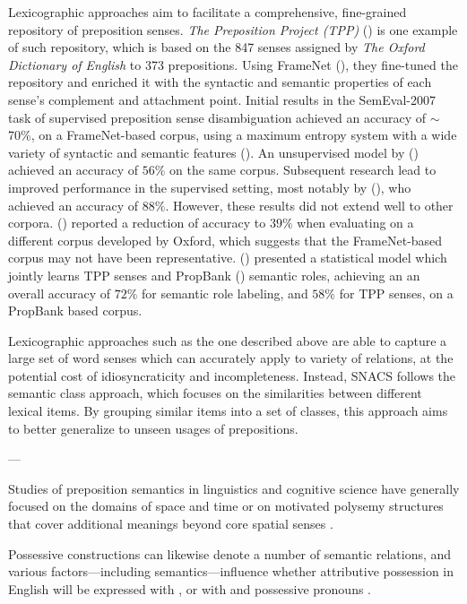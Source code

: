 Lexicographic approaches aim to facilitate a comprehensive, fine-grained repository of preposition senses. \textit{The Preposition Project (TPP)} (\cite{litkowski-05}) is one example of such repository, which is based on the 847 senses assigned by \textit{The Oxford Dictionary of English} to 373 prepositions. Using FrameNet (\cite{baker-98}), they fine-tuned the repository and enriched it with the syntactic and semantic properties of each sense's complement and attachment point. Initial results in the SemEval-2007 task of supervised preposition sense disambiguation achieved an accuracy of $\sim$70\%, on a FrameNet-based corpus, using a maximum entropy system with a wide variety of syntactic and semantic
features (\cite{ye2007melb}). An unsupervised model by (\cite{hovy-11}) achieved an accuracy of $56\%$ on the same corpus. Subsequent research lead to improved performance in the supervised setting, most notably by (\cite{tratz2011semantically}), who achieved an accuracy of $88\%$. 
However, these results did not extend well to other corpora. (\cite{litkowski2013preposition}) reported a reduction of accuracy to $39\%$ when evaluating on a different corpus developed by Oxford, which suggests that the FrameNet-based corpus may not have been representative. (\cite{dahlmeier-09}) presented a statistical model which jointly learns TPP senses and PropBank (\cite{kingsbury2002treebank}) semantic roles, achieving an an overall accuracy of $72\%$ for semantic role labeling, and $58\%$ for TPP senses, on a PropBank based corpus.

Lexicographic approaches such as the one described above are able to capture a large set of word senses which can accurately apply to variety of relations, at the potential cost of idiosyncraticity and incompleteness. Instead, SNACS follows the semantic class approach, which focuses on the similarities between different lexical items. By grouping similar items into a set of classes, this approach aims to better generalize to unseen usages of prepositions.


---

Studies of preposition semantics in linguistics and cognitive science have generally focused on the domains of space and time \citep[e.g.,][]{herskovits-86,bowerman-01,regier-96,khetarpal-09,xu-10,zwarts-00} or on motivated polysemy structures that cover additional meanings beyond core spatial senses \citep{brugman-81,lakoff-87,tyler-03,lindstromberg-10}.


Possessive constructions can likewise denote a number of semantic relations, and various factors---including semantics---influence whether attributive possession in English will be expressed with , or with  and possessive pronouns \citep[the `genitive alternation';][]{taylor-96,nikiforidou-91,rosenbach-02,heine-06,wolk-13,shih-15}.

